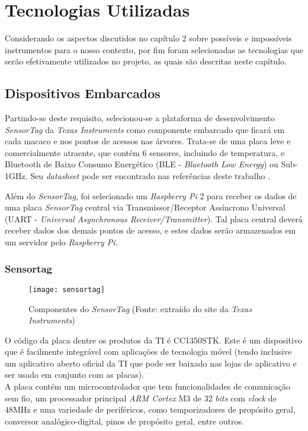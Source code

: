 \chapter{Tecnologias Utilizadas}
Considerando os aspectos discutidos no capítulo 2 sobre possíveis e impossíveis instrumentos para o nosso contexto, por fim foram selecionadas as tecnologias que serão efetivamente utilizados no projeto, as quais são descritas neste capítulo.

\section{Dispositivos Embarcados}

Partindo-se deste requisito, selecionou-se a plataforma de desenvolvimento \emph{SensorTag} da \emph{Texas Instruments} como componente embarcado que ficará em cada macaco e nos pontos de acessos nas árvores. Trata-se de uma placa leve e comercialmente atraente, que contém 6 sensores, incluindo de temperatura, e Bluetooth de Baixo Consumo Energético (BLE - \emph{Bluetooth Low Energy}) ou Sub-1GHz. Seu \emph{datasheet} pode ser encontrado nas referências deste trabalho \cite{datasheet}.

Além do \emph{SensorTag}, foi selecionado um \emph{Raspberry Pi} 2 para receber os dados de uma placa \emph{SensorTag} central via Transmissor/Receptor Assíncrono Universal (UART - \emph{Universal Asynchronous Receiver/Transmitter}). Tal placa central deverá receber dados dos demais pontos de acesso, e estes dados serão armazenados em um servidor pelo \emph{Raspberry Pi}.

\subsection{Sensortag}

\begin{figure}[ht]
  \centering
    \texttt{[image: sensortag]}
  \caption{Componentes do \emph{SensorTag} (Fonte: extraído do site da \emph{Texas Instruments})}
\end{figure}

O código da placa dentre os produtos da TI é CC1350STK. Este é um dispositivo que é facilmente integrável com aplicações de tecnologia móvel (tendo inclusive um aplicativo aberto oficial da TI que pode ser baixado nas lojas de aplicativo e ser usado em conjunto com as placas).\\

A placa contém um microcontrolador que tem funcionalidades de comunicação sem fio, um processador principal \emph{ARM Cortex} M3 de 32 \emph{bits} com \emph{clock} de 48MHz e uma variedade de periféricos, como temporizadores de propósito geral, conversor analógico-digital, pinos de propósito geral, entre outros.

